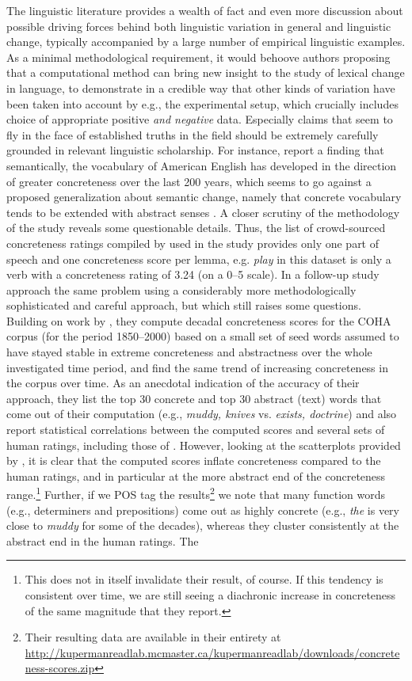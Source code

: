 \documentclass[output=paper]{langsci/langscibook}
\begin{document}
The linguistic literature provides a wealth of fact and even more discussion about possible driving forces behind both linguistic
variation in general and linguistic change, typically accompanied by a
large number of empirical linguistic examples. As a minimal
methodological requirement, it would behoove authors proposing that a
computational method can bring new insight to the study of lexical
change in language, to demonstrate in a credible way that other kinds
of variation have been taken into account by e.g., the experimental
setup, which crucially includes choice of appropriate positive \emph{and negative} data. Especially claims that seem to fly in the face of established truths in the field should be extremely carefully grounded in relevant linguistic scholarship. For instance, \citet{hills-adelman-2015} report a finding that semantically, the vocabulary of American English has developed in the direction of greater concreteness over the last 200 years, which seems to go against a proposed generalization about semantic change, namely that concrete vocabulary tends to be extended with abstract senses  \citep[383]{urban-2015}. A closer scrutiny of the methodology of the study reveals some questionable details. Thus, the list of crowd-sourced concreteness ratings compiled by \citet{brysbaert-etal-2012} used in the study provides only one part of speech and one concreteness score per lemma, e.g. \emph{play} in this dataset is only a verb with a concreteness rating of 3.24 (on a 0--5 scale). In a follow-up study \citet{snefjella-etal-2018} approach the same problem using a considerably more methodologically sophisticated and careful approach, but which still raises some questions. Building on work by \citet{hamilton-etal-2016}, they compute decadal concreteness scores for the COHA corpus (for the period 1850--2000) based on a small set of seed words assumed to have stayed stable in extreme concreteness and abstractness over the whole investigated time period, and find the same trend of increasing concreteness in the corpus over time. As an anecdotal indication of the accuracy of their approach, they list the top 30 concrete and top 30 abstract (text) words that come out of their computation (e.g., \emph{muddy, knives} vs. \emph{exists, doctrine}) and also report statistical correlations between the computed scores and several sets of human ratings, including those of \citet{brysbaert-etal-2012}. However, looking at the scatterplots provided by  \citet[6]{snefjella-etal-2018}, it is clear that the computed scores inflate concreteness compared to the human ratings, and in particular at the more abstract end of the concreteness range.\footnote{This does not in itself invalidate their result, of course. If this tendency is consistent over time, we are still seeing a diachronic increase in concreteness of the same magnitude that they report.} Further, if we POS tag the results\footnote{Their resulting data are available in their entirety at \url{http://kupermanreadlab.mcmaster.ca/kupermanreadlab/downloads/concreteness-scores.zip}} we note that many function words (e.g., determiners and prepositions) come out as highly concrete (e.g., \emph{the} is very close to \emph{muddy} for some of the decades), whereas they cluster consistently at the abstract end in the human ratings. The 
\end{document}
